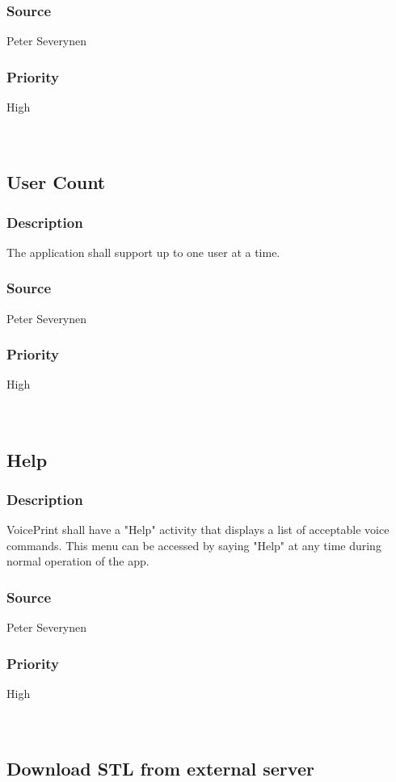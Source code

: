 \subsubsection{Source}
Peter Severynen
\subsubsection{Priority}
High\\
\\
\\
\subsection{User Count}
\subsubsection{Description}
The application shall support up to one user at a time.
\subsubsection{Source}
Peter Severynen
\subsubsection{Priority}
High\\
\\
\\
\subsection{Help}
\subsubsection{Description}
VoicePrint shall have a "Help" activity that displays a list of acceptable voice commands. This menu can be accessed by saying "Help" at any time during normal operation of the app.
\subsubsection{Source}
Peter Severynen
\subsubsection{Priority}
High\\
\\
\\
\subsection{Download STL from external server}
